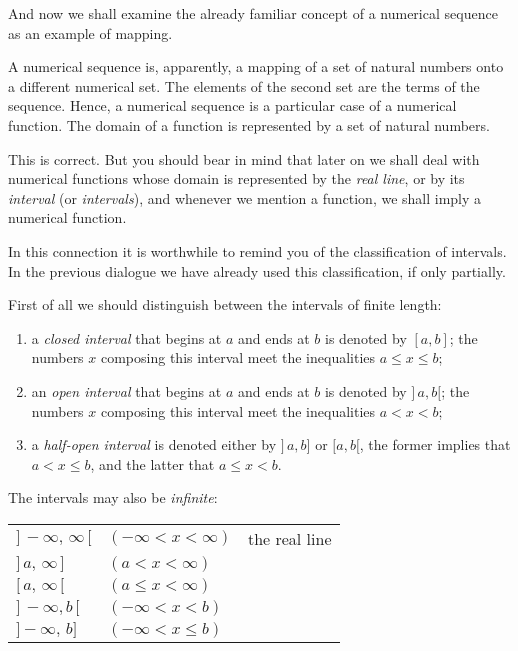 {And now we shall examine the already familiar concept of a numerical sequence as an example of mapping.

\rdr A numerical sequence is, apparently, a mapping of a set of natural numbers onto a different numerical set. The elements of the second set are the terms of the sequence. Hence, a numerical sequence is a particular case of a numerical function. The domain of a function is represented by a set of natural numbers.

\athr This is correct. But you should bear in mind that later on we shall deal with numerical functions whose domain is represented by the \emph{real line}, or by its \emph{interval} (or \emph{intervals}), and whenever we mention a function, we shall imply a numerical function.

In this connection it is worthwhile to remind you of the classification of intervals. In the previous dialogue we have already used this classification, if only partially.

First of all we should distinguish between the intervals of finite length:
\begin{enumerate}[label=$\textcolor{IndianRed}{\blacktriangleright}$]

\item a \emph{closed interval} that begins at $a$ and ends at $b$ is denoted by $[a, b]$; the numbers $x$ composing this interval meet the inequalities $a \leqslant x \leqslant b$;

\item an \emph{open interval} that begins at $a$ and ends at $b$ is denoted by $]\, a, b[$; the numbers $x$ composing this interval meet the inequalities	$a < x < b$;

\item a \emph{half-open interval} is denoted either by $] \, a, b]$ or $[a, b[$, the former implies that $ a < x \leqslant b$, and the latter that $a \leqslant x < b$.
\end{enumerate}

The intervals may also be \emph{infinite}:
\begin{center}
\begin{tabular}{llc}
$]\, - \infty, \, \infty \, [$ &	$( -	\infty < x < \infty)$ &	the real line \\
$] \, a, \, \infty  \, ]$ & $(a < x < \infty)$ & \\
$[\, a, \, \infty \, [$ &  $(a  \leqslant x < \infty)$ & \\
$] \, - \infty, b \, [$ & $(- \infty < x < b)$ & \\
$ ]- \infty, \, b]$  & $(-  \infty < x \leqslant b)$ & \\
\end{tabular}
\end{center}

}
